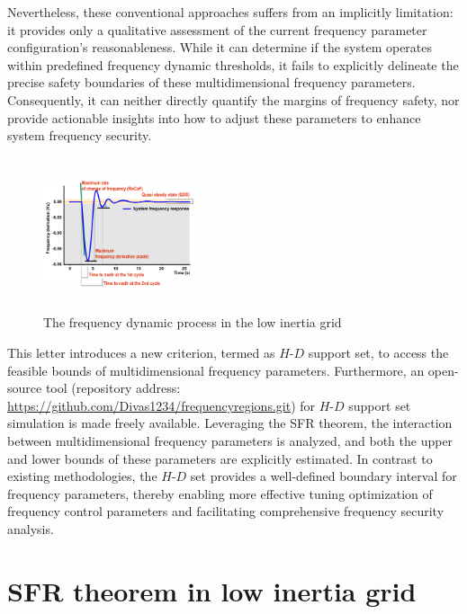 \documentclass[lettersize,journal]{IEEEtran}
\begin{document}
Nevertheless, these conventional approaches suffers from an implicitly limitation: it provides only a qualitative assessment of the current frequency parameter configuration's reasonableness. While it can determine if the system operates within predefined frequency dynamic thresholds, it fails to explicitly delineate the precise safety boundaries of these multidimensional frequency parameters. Consequently, it can neither directly quantify the margins of frequency safety, nor provide actionable insights into how to adjust these parameters to enhance system frequency security.

\begin{figure}[!t]
	\centering
	\includegraphics[width=0.4\textwidth,height=4.5cm]{frequency_response.pdf}\vspace{-0.25cm}
	\caption{The frequency dynamic process in the low inertia grid}\vspace{-0.25cm}
	\label{fig:sfr}
\end{figure}

This letter introduces a new criterion, termed as $H$-$D$ support set, to access the feasible bounds of multidimensional frequency parameters. Furthermore, an open-source tool (repository address: \url{https://github.com/Divas1234/frequencyregions.git}) for $H$-$D$ support set simulation is made freely available. Leveraging the SFR theorem, the interaction between multidimensional frequency parameters is analyzed, and both the upper and lower bounds of these parameters are explicitly estimated. In contrast to existing methodologies, the $H$-$D$ set provides a well-defined boundary interval for frequency parameters, thereby enabling more effective tuning optimization of frequency control parameters and facilitating comprehensive frequency security analysis.

\vspace{-0.25cm}
\section{SFR theorem in low inertia grid}
\end{document}
